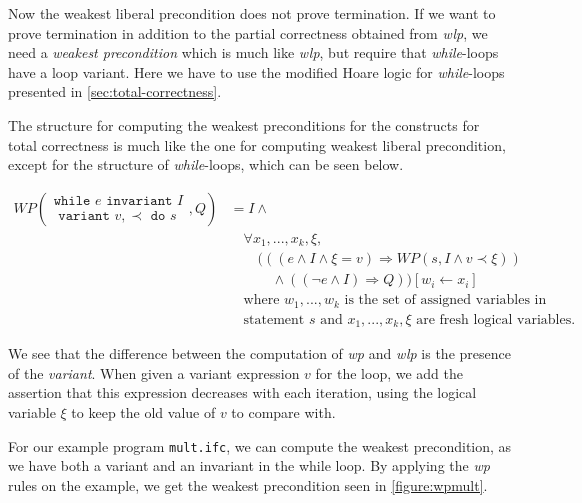 Now the weakest liberal precondition does not prove termination. If we want to prove termination in addition to the partial correctness obtained from \textit{wlp}, we need a \textit{weakest precondition} which is much like \textit{wlp}, but require that \textit{while}-loops have a loop variant. 
Here we have to use the modified Hoare logic for \textit{while}-loops presented in \ref{sec:total-correctness}.

The structure for computing the weakest preconditions for the constructs for total correctness is much like the one for computing weakest liberal precondition, except for the structure of \textit{while}-loops, which can be seen below.

\begin{align*}
	WP\left(
     \begin{array}{c}
     \texttt{while } e \texttt{ invariant } I \\
     \texttt{ variant } v, \prec \texttt{ do } s
     \end{array}
    , Q \right) 
    &= 
		I \land \\
    &\quad \forall x_1, ..., x_k, \xi, \\
    &\quad \quad (((e \land I \land \xi = v) \Rightarrow WP(s, I \land v \prec \xi)) \\
    &\quad \quad \quad \land ((\neg e \land I) \Rightarrow Q)) [w_i \leftarrow x_i] \\
	&\quad \text{where } w_1, ..., w_k \text{ is the set of assigned variables in} \\
  &\quad \text{statement } s \text{ and } x_1, ..., x_k, \xi \text{ are fresh logical variables.}
\end{align*}

We see that the difference between the computation of \textit{wp} and \textit{wlp} is the presence of the \textit{variant}. When given a variant expression $v$ for the loop, we add the assertion that this expression decreases with each iteration, using the logical variable $\xi$ to keep the old value of $v$ to compare with.

For our example program \texttt{mult.ifc}, we can compute the weakest precondition, as we have both a variant and an invariant in the while loop.
By applying the \textit{wp} rules on the example, we get the weakest precondition seen in \autoref{figure:wpmult}.

